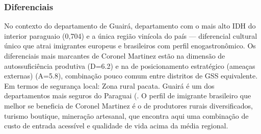 \subsubsection*{Diferenciais}\label{dif-coronel-martinez-0404}
No contexto do departamento de Guairá, departamento com o mais alto IDH do interior paraguaio (0,704) e a única região vinícola do país — diferencial cultural único que atrai imigrantes europeus e brasileiros com perfil enogastronômico. Os diferenciais mais marcantes de Coronel Martinez estão na dimensão de autossuficiência produtiva (D=6.2) e na de posicionamento estratégico (ameaças externas) (A=5.8), combinação pouco comum entre distritos de GSS equivalente. Em termos de segurança local: Zona rural pacata. Guairá é um dos departamentos mais seguros do Paraguai (. O perfil de imigrante brasileiro que melhor se beneficia de Coronel Martinez é o de produtores rurais diversificados, turismo boutique, mineração artesanal, que encontra aqui uma combinação de custo de entrada acessível e qualidade de vida acima da média regional.
